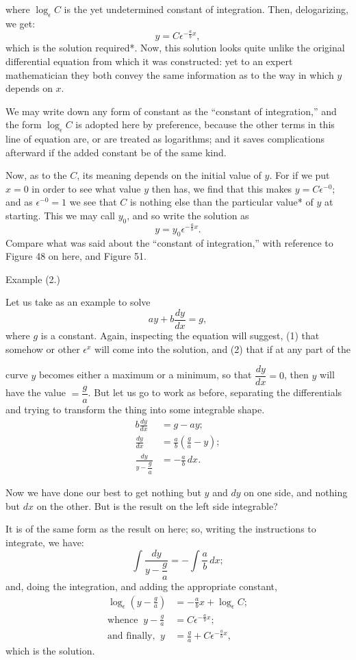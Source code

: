 \documentclass{ximera}
\begin{document}
where $\log_\epsilon C$ is the yet undetermined constant
of
integration. Then, delogarizing, we get:
\[
y = C \epsilon^{-\frac{a}{b} x},
\]
which is the solution required*. Now, this solution
looks quite unlike the original differential equation
from which it was constructed: yet to an expert
mathematician they both convey the same information
as to the way in which $y$ depends on $x$.

We may write down any form of constant as the “constant of
  integration,” and the form $\log_\epsilon C$ is adopted here by preference,
  because the other terms in this line of equation are, or are treated
  as logarithms; and it saves complications afterward if the added
  constant be of the same kind.

Now, as to the $C$, its meaning depends on the
initial value of $y$. For if we put $x = 0$ in order to
see what value $y$ then has, we find that this makes
$y = C \epsilon^{-0}$; and as $\epsilon^{-0} = 1$ we see that $C$ is nothing else
than the particular value*
 of $y$ at starting. This we
may call $y_0$, and so write the solution as
\[
y = y_0 \epsilon^{-\frac{a}{b} x}.
\]
Compare what was said about the ``constant of integration,''
  with reference to Figure 48 on here, and Figure 51.


Example (2.)

Let us take as an example to solve
\[
ay + b \frac{dy}{dx} = g,
\]
where $g$ is a constant. Again, inspecting the equation
will suggest, (1) that somehow or other $\epsilon^x$ will come
into the solution, and (2) that if at any part of the

curve $y$ becomes either a maximum or a minimum, so
that $\dfrac{dy}{dx} = 0$, then $y$ will have the value $= \dfrac{g}{a}$. But let
us go to work as before, separating the differentials
and trying to transform the thing into some integrable
shape.
\begin{align*}
b\frac{dy}{dx}           &= g -ay; \\
\frac{dy}{dx}            &= \frac{a}{b}\left(\frac{g}{a}-y\right); \\
\frac{dy}{y-\dfrac{g}{a}} &= -\frac{a}{b}\, dx.
\end{align*}

Now we have done our best to get nothing but $y$ and $dy$
on one side, and nothing but $dx$ on the other.
But is the result on the left side integrable?

It is of the same form as the result on here; so,
writing the instructions to integrate, we have:
\[
\int{\frac{dy}{y-\dfrac{g}{a}}} = - \int{\frac{a}{b}\, dx};
\]
and, doing the integration, and adding the appropriate
constant,
\begin{align*}
\log_\epsilon\left(y-\frac{g}{a}\right) &= -\frac{a}{b}x + \log_\epsilon C; \\
 \text{whence}\;\;        y-\frac{g}{a} &= C\epsilon^{-\frac{a}{b}x}; \\
 \text{and finally,}\;\;              y &= \frac{g}{a} + C\epsilon^{-\frac{a}{b}x},
\end{align*}
which is the solution.
\end{document}
